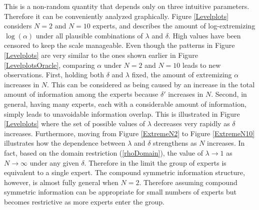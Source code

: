 \documentclass[11pt]{article}
\theoremstyle{definition}
\theoremstyle{definition}
\begin{document}
This is a non-random quantity that depends only on three intuitive parameters. Therefore it can be conveniently analyzed graphically. Figure \ref{Levelplots} considers $N = 2$ and $N = 10$ experts, and describes the amount of log-extremizing $\log(\alpha)$ under all plausible combinations of $\lambda$ and $\delta$. High values have been censored to keep the scale manageable. Even though the patterns in Figure \ref{Levelplots}  are very similar to the ones shown earlier in Figure \ref{LevelplotsOracle}, comparing $\alpha$ under $N = 2$ and $N = 10$ leads to new observations. First, holding both $\delta$ and $\lambda$ fixed, the amount of extremizing $\alpha$ increases in $N$. This can be considered as being caused by an increase in the total amount of information among the experts because $\delta'$ increases in $N$. Second, in general, having many experts, each with a considerable amount of information, simply leads to unavoidable information overlap. This is illustrated in Figure \ref{Levelplots} where the set of possible values of $\lambda$ decreases very rapidly as $\delta$ increases. Furthermore, moving from Figure \ref{ExtremeN2} to Figure \ref{ExtremeN10} illustrates how the dependence between $\lambda$ and $\delta$ strengthens as $N$ increases. In fact, based on the domain restriction (\ref{rhoDomain}), the value of $\lambda \to 1$ as $N \to \infty$ under any given $\delta$. Therefore in the limit the group of experts is equivalent to a single expert. The compound symmetric information structure, however, is almost fully general when $N = 2$. Therefore assuming compound symmetric information can be appropriate for small numbers of experts but becomes restrictive as more experts enter the group. 








\end{document}
